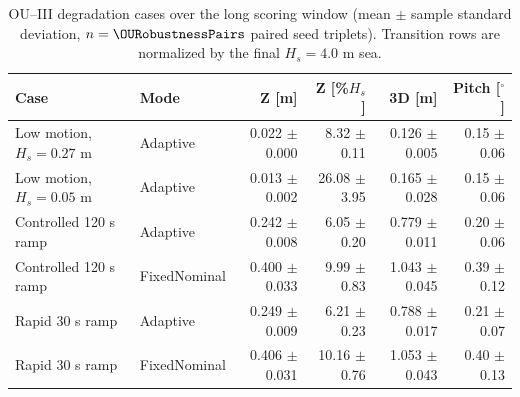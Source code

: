 \begin{table}[t]
  \centering
  \caption{OU--III degradation cases over the long scoring window (mean $\pm$ sample standard deviation, $n=\OURobustnessPairs$ paired seed triplets). Transition rows are normalized by the final $H_s=4.0$ m sea.}
  \label{tab:ou_robustness_stress}
  \footnotesize
  \setlength{\tabcolsep}{5pt}
  \begin{tabular}{@{}llrrrr@{}}
    \toprule
    Case & Mode & Z [m] & Z [\%$H_s$] & 3D [m] & Pitch [$^\circ$] \\
    \midrule
    Low motion, $H_s=0.27$ m & Adaptive & 0.022 $\pm$ 0.000 & 8.32 $\pm$ 0.11 & 0.126 $\pm$ 0.005 & 0.15 $\pm$ 0.06 \\
    Low motion, $H_s=0.05$ m & Adaptive & 0.013 $\pm$ 0.002 & 26.08 $\pm$ 3.95 & 0.165 $\pm$ 0.028 & 0.15 $\pm$ 0.06 \\
    Controlled 120 s ramp & Adaptive & 0.242 $\pm$ 0.008 & 6.05 $\pm$ 0.20 & 0.779 $\pm$ 0.011 & 0.20 $\pm$ 0.06 \\
    Controlled 120 s ramp & FixedNominal & 0.400 $\pm$ 0.033 & 9.99 $\pm$ 0.83 & 1.043 $\pm$ 0.045 & 0.39 $\pm$ 0.12 \\
    Rapid 30 s ramp & Adaptive & 0.249 $\pm$ 0.009 & 6.21 $\pm$ 0.23 & 0.788 $\pm$ 0.017 & 0.21 $\pm$ 0.07 \\
    Rapid 30 s ramp & FixedNominal & 0.406 $\pm$ 0.031 & 10.16 $\pm$ 0.76 & 1.053 $\pm$ 0.043 & 0.40 $\pm$ 0.13 \\
    \bottomrule
  \end{tabular}
\end{table}
